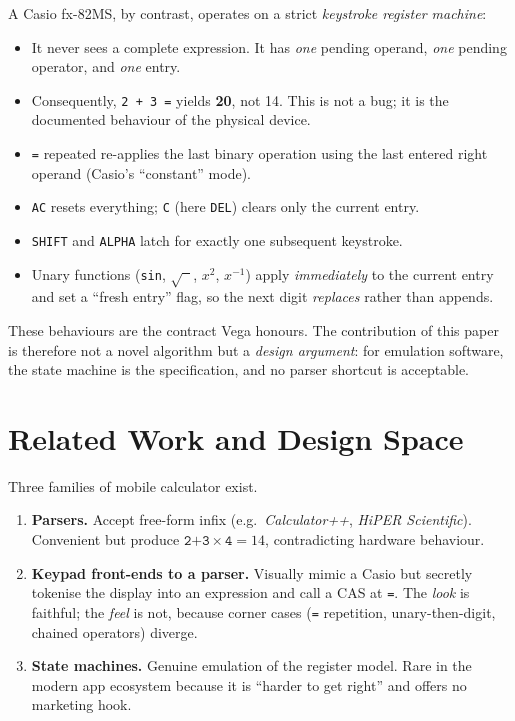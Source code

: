 \documentclass[11pt,a4paper]{article}
\begin{document}
A Casio fx-82MS, by contrast, operates on a strict \emph{keystroke register machine}:
\begin{itemize}[leftmargin=*,itemsep=0pt]
    \item It never sees a complete expression. It has \emph{one} pending operand, \emph{one} pending operator, and \emph{one} entry.
    \item Consequently, \texttt{2 + 3  =} yields \textbf{20}, not 14. This is not a bug; it is the documented behaviour of the physical device.
    \item \texttt{=} repeated re-applies the last binary operation using the last entered right operand (Casio's ``constant'' mode).
    \item \texttt{AC} resets everything; \texttt{C} (here \texttt{DEL}) clears only the current entry.
    \item \texttt{SHIFT} and \texttt{ALPHA} latch for exactly one subsequent keystroke.
    \item Unary functions (\texttt{sin}, $\sqrt{\phantom{x}}$, $x^2$, $x^{-1}$) apply \emph{immediately} to the current entry and set a ``fresh entry'' flag, so the next digit \emph{replaces} rather than appends.
\end{itemize}

These behaviours are the contract Vega honours. The contribution of this paper is therefore not a novel algorithm but a \emph{design argument}: for emulation software, the state machine is the specification, and no parser shortcut is acceptable.

\section{Related Work and Design Space}

Three families of mobile calculator exist.

\begin{enumerate}[leftmargin=*,itemsep=2pt]
    \item \textbf{Parsers.} Accept free-form infix (e.g.\ \emph{Calculator++}, \emph{HiPER Scientific}). Convenient but produce $\texttt{2+3}\times\texttt{4}=14$, contradicting hardware behaviour.
    \item \textbf{Keypad front-ends to a parser.} Visually mimic a Casio but secretly tokenise the display into an expression and call a CAS at \texttt{=}. The \emph{look} is faithful; the \emph{feel} is not, because corner cases (\texttt{=} repetition, unary-then-digit, chained operators) diverge.
    \item \textbf{State machines.} Genuine emulation of the register model. Rare in the modern app ecosystem because it is ``harder to get right'' and offers no marketing hook.
\end{enumerate}
\end{document}
